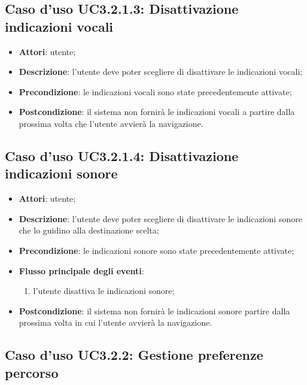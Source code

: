 \documentclass[../AnalisiDeiRequisiti.tex]{subfiles}
\begin{document}
\subsection{Caso d'uso UC3.2.1.3: Disattivazione indicazioni vocali}
\begin{itemize}
	\item \textbf{Attori}: utente;
	\item \textbf{Descrizione}: l'utente deve poter scegliere di disattivare le indicazioni vocali; 
	\item \textbf{Precondizione}: le indicazioni vocali sono state precedentemente attivate;
	\item \textbf{Postcondizione}: il sistema non fornirà le indicazioni vocali a partire dalla prossima volta che l'utente avvierà la navigazione.
\end{itemize}
\hypertarget{UC3.2.1.4}{}
\subsection{Caso d'uso UC3.2.1.4: Disattivazione indicazioni sonore}
\begin{itemize}
	\item \textbf{Attori}: utente;
	\item \textbf{Descrizione}: l'utente deve poter scegliere di disattivare le indicazioni sonore che lo guidino alla destinazione scelta; 
	\item \textbf{Precondizione}: le indicazioni sonore sono state precedentemente attivate;
	
	\item \textbf{Flusso principale degli eventi}:
	\begin{enumerate}
		\item l'utente disattiva le indicazioni sonore;
		
	\end{enumerate}
	\item \textbf{Postcondizione}: il sistema non fornirà le indicazioni sonore partire dalla prossima volta in cui l'utente avvierà la navigazione.
\end{itemize}
\hypertarget{UC3.2.2}{}
\subsection{Caso d'uso UC3.2.2: Gestione preferenze percorso}
\end{document}
